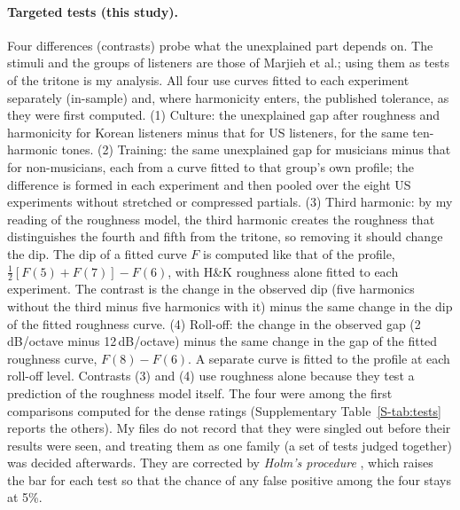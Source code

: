 \documentclass[11pt,a4paper]{article}
\newcommand{\HK}{H\&K}
\begin{document}
\paragraph{Targeted tests (this study).}
Four differences (contrasts) probe what the unexplained part depends on. The stimuli and the
groups of listeners are those of Marjieh et al.; using them as tests of the tritone is my
analysis. All four use curves fitted to each experiment separately (in-sample) and, where
harmonicity enters, the published tolerance, as they were first computed. (1) Culture: the
unexplained gap after roughness and harmonicity for Korean listeners minus that for US
listeners, for the same ten-harmonic tones. (2) Training: the same unexplained gap for musicians
minus that for non-musicians, each from a curve fitted to that group's own profile; the difference is formed in each experiment and then pooled over the eight US experiments without stretched or
compressed partials. (3) Third harmonic: by my reading of the roughness model, the third harmonic
creates the roughness that distinguishes the fourth and fifth from the tritone, so removing
it should change the dip. The dip of a fitted curve $F$ is computed like that of the profile,
$\tfrac12[F(5)+F(7)]-F(6)$, with \HK{} roughness alone fitted to each experiment. The contrast
is the change in the observed dip (five harmonics without the third minus five harmonics with
it) minus the same change in the dip of the fitted roughness curve. (4) Roll-off: the change in the observed gap (2\,dB/octave minus
12\,dB/octave) minus the same change in the gap of the fitted roughness curve, $F(8)-F(6)$. A separate
curve is fitted to the profile at each roll-off level. Contrasts (3) and
(4) use roughness alone because they test a prediction of the roughness model itself. The four were among the first comparisons computed for the dense ratings (Supplementary Table~\ref{S-tab:tests} reports the others). My files do not record that they were singled out before their results were seen, and treating them as one family (a set of tests judged together) was decided afterwards. They are corrected by \emph{Holm's procedure} \citep{holm1979}, which raises the bar
for each test so that the chance of any false positive among the four stays at 5\%.
\end{document}
